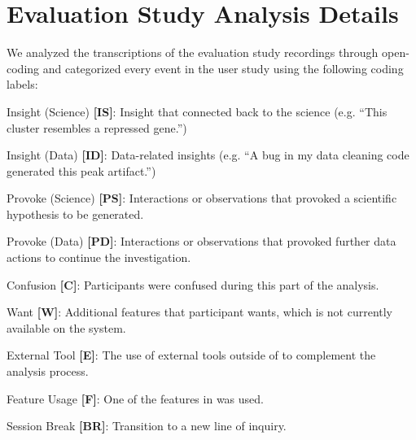  \section{Evaluation Study Analysis Details\label{apdx:studydetails}}
 We analyzed the transcriptions of the evaluation study recordings through open-coding and
 categorized every event in the user study using the following coding labels:
 \begin{denselist}
     \item Insight (Science) \textbf{[IS]}: Insight that connected back to the science (e.g. ``This cluster resembles a repressed gene.'')
     \item Insight (Data) \textbf{[ID]}: Data-related insights (e.g. ``A bug in my data cleaning code generated this peak artifact.'')
     \item Provoke (Science) \textbf{[PS]}: Interactions or observations that provoked a scientific hypothesis to be generated.
     \item Provoke (Data) \textbf{[PD]}: Interactions or observations that provoked further data actions to continue the investigation.
     \item Confusion \textbf{[C]}: Participants were confused during this part of the analysis.
     \item Want \textbf{[W]}: Additional features that participant wants, which is not currently available on the system.
     \item External Tool \textbf{[E]}: The use of external tools outside of \zvpp to complement the analysis process.
     \item Feature Usage \textbf{[F]}: One of the features in \zvpp was used.
     \item Session Break \textbf{[BR]}: Transition to a new line of inquiry.
 \end{denselist}
